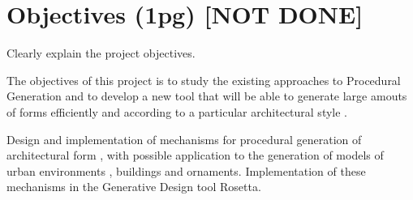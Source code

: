 
% 
% 

\section{Objectives (1pg) [NOT DONE]}

Clearly explain the project objectives.

The objectives of this project is to study the existing approaches to Procedural Generation and to develop a new tool that will be able to generate large amouts of forms efficiently and according to a particular architectural style .



Design and implementation of mechanisms for procedural generation of architectural form , with possible application to the generation of models of urban environments , buildings and ornaments. Implementation of these mechanisms in the Generative Design tool Rosetta.


